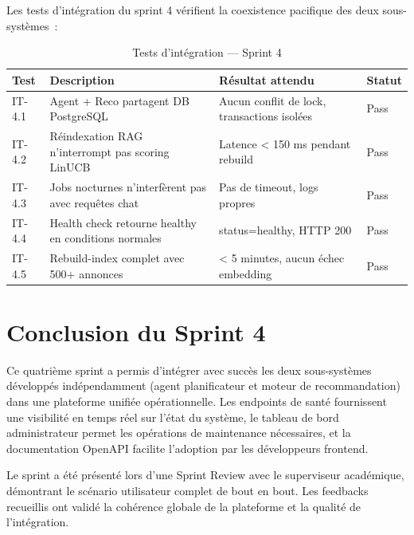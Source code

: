 Les tests d'intégration du sprint 4 vérifient la coexistence pacifique des deux sous-systèmes~:

\begin{table}[H]
    \centering
    \caption{Tests d'intégration — Sprint 4}
    \label{tab:integration_tests_s4}
    \small
    \begin{tabular}{p{4cm} p{5cm} p{3cm} p{3cm}}
        \toprule
        \textbf{Test} & \textbf{Description} & \textbf{Résultat attendu} & \textbf{Statut} \\
        \midrule
        IT-4.1 & Agent + Reco partagent DB PostgreSQL & Aucun conflit de lock, transactions isolées & Pass \\
        IT-4.2 & Réindexation RAG n'interrompt pas scoring LinUCB & Latence < 150 ms pendant rebuild & Pass \\
        IT-4.3 & Jobs nocturnes n'interfèrent pas avec requêtes chat & Pas de timeout, logs propres & Pass \\
        IT-4.4 & Health check retourne healthy en conditions normales & status=healthy, HTTP 200 & Pass \\
        IT-4.5 & Rebuild-index complet avec 500+ annonces & < 5 minutes, aucun échec embedding & Pass \\
        \bottomrule
    \end{tabular}
\end{table}


\section{Conclusion du Sprint 4}

Ce quatrième sprint a permis d'intégrer avec succès les deux sous-systèmes développés
indépendamment (agent planificateur et moteur de recommandation) dans une plateforme unifiée
opérationnelle. Les endpoints de santé fournissent une visibilité en temps réel sur l'état du
système, le tableau de bord administrateur permet les opérations de maintenance nécessaires, et
la documentation OpenAPI facilite l'adoption par les développeurs frontend.

Le sprint a été présenté lors d'une Sprint Review avec le superviseur académique, démontrant
le scénario utilisateur complet de bout en bout. Les feedbacks recueillis ont validé la
cohérence globale de la plateforme et la qualité de l'intégration.

